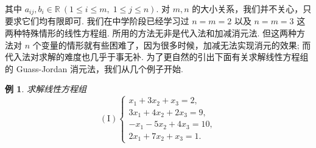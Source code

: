 \documentclass[10pt,openany]{article}
\theoremstyle{thmstyle} %
\theoremstyle{defstyle} %
\theoremstyle{prostyle} %
\theoremstyle{exastyle}
\newtheorem{example}[theorem]{例}
\theoremstyle{remstyle}
\begin{document}
其中 \( a_{ij}, b_i \in \mathbb{R} \ (1 \leq i \leq m,\; 1 \leq j \leq n) \). 对 \( m,n \) 的大小关系，我们并不关心，只要求它们均有限即可. 我们在中学阶段已经学习过 \( n=m=2 \) 以及 \( n=m=3 \) 这两种特殊情形的线性方程组. 所用的方法无非是代入法和加减消元法. 但这两种方法对 \( n \) 个变量的情形就有些困难了，因为很多时候，加减无法实现消元的效果; 而代入法对求解的难度也几乎于事无补. 为了更自然的引出下面有关求解线性方程组的 Guass-Jordan 消元法，我们从几个例子开始.

\begin{example}
	求解线性方程组
	\[
	(\text{I}) \left\{
	\begin{array}{l}
		x_1 + 3x_2 + x_3 = 2, \\
		3x_1 + 4x_2 + 2x_3 = 9, \\
		-x_1 - 5x_2 + 4x_3 = 10, \\
		2x_1 + 7x_2 + x_3 = 1.
	\end{array}
	\right.
	\]
	\label{1.1.1}
\end{example}
\end{document}
